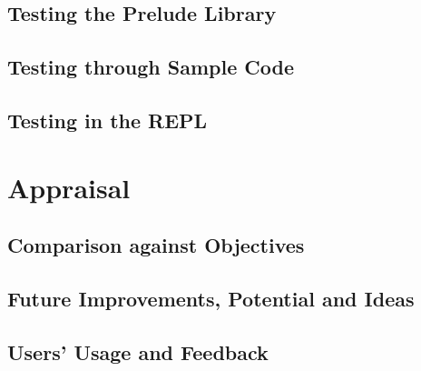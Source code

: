\documentclass{article}
\begin{document}
  \subsection{Testing the Prelude Library}
  \subsection{Testing through Sample Code}
  \subsection{Testing in the REPL}

\section{Appraisal}
  \subsection{Comparison against Objectives}
  \subsection{Future Improvements, Potential and Ideas}
  \subsection{Users' Usage and Feedback }


  \clearpage
  \let\Section\section
  \def\section*#1{\Section{#1}}

  \printbibliography
\end{document}
